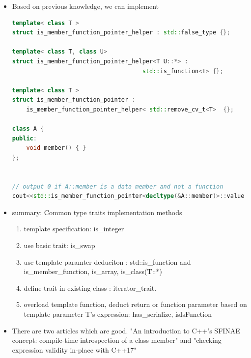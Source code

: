 \documentclass[a4paper,11pt,twoside]{book}
\newcommand{\Hilight}[1]{\makebox[0pt][l]{\color{yellow}\rule[-3pt]{#1em}{11pt}}}
\newcommand{\Hilight}[1]{}
\begin{document}
\begin{itemize}
\begin{lstlisting}[frame=single, language=c++]
template<class T, class U>
struct PM_traits<$\Hilight{5}$U T::*> {
	using member_type = U;
};

int main() {
	using T = PM_traits<decltype(&A::fun)>::member_type; 
	// T is int() const&
}
\end{lstlisting}
	
	\item Based on previous knowledge, we can implement 
\begin{lstlisting}[frame=single, language=c++]
template< class T >
struct is_member_function_pointer_helper : std::false_type {};
	
template< class T, class U>
struct is_member_function_pointer_helper<T U::*> :
                                     std::is_function<T> {};
	
template< class T >
struct is_member_function_pointer : 
    is_member_function_pointer_helper< std::remove_cv_t<T>  {};
	
class A {
public:
	void member() { }
};
	

// output 0 if A::member is a data member and not a function
cout<<std::is_member_function_pointer<decltype(&A::member)>::value
\end{lstlisting}
	
	\item summary: Common type traits implementation methods
	\begin{enumerate}
		\item template specification: is\_integer
		\item use basic trait: is\_swap
		\item use template paramter deduciton : std::is\_function and
		is\_member\_function, is\_array, is\_class(T::*)
		\item define trait in existing class : iterator\_trait.
		\item overload template function, deduct return or function parameter based on template parameter T's expression:  has\_serialize, isIsFunction
	\end{enumerate}

	\item There are two articles which are good.
"An introduction to C++'s SFINAE concept: compile-time introspection of a class member" and "checking expression validity in-place with C++17"
\end{itemize}
\end{document}
